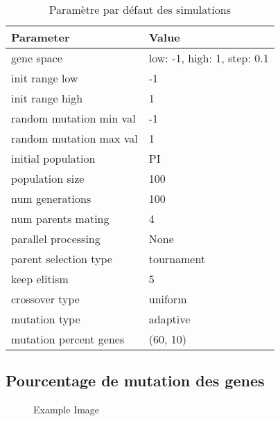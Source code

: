 \documentclass[journal, a4paper]{IEEEtran}
\begin{document}
	\begin{table}[!hbt]
		\caption{Paramètre par défaut des simulations}
		\label{tab:simParameters}
		\begin{tabular}{|l|l|}
			\hline
			\textbf{Parameter} & \textbf{Value} \\
			\hline
			gene space & {low: -1, high: 1, step: 0.1} \\
			\hline
			init range low & -1 \\
			\hline
			init range high & 1 \\
			\hline
			random mutation min val & -1 \\
			\hline
			random mutation max val & 1 \\
			\hline
			initial population & PI \\
			\hline
			population size & 100 \\
			\hline
			num generations & 100 \\
			\hline
			num parents mating & 4 \\
			\hline
			parallel processing & None \\
			\hline
			parent selection type & tournament \\
			\hline
			keep elitism & 5 \\
			\hline
			crossover type & uniform \\
			\hline
			mutation type & adaptive \\
			\hline
			mutation percent genes & (60, 10) \\
			\hline
			\end{tabular}

	\end{table}
	\subsection{Pourcentage de mutation des genes}
	\begin{figure}
	  \centering
	  \caption{Example Image}
	  \label{fig:pop20mut60-10}
	\end{figure}
\end{document}
